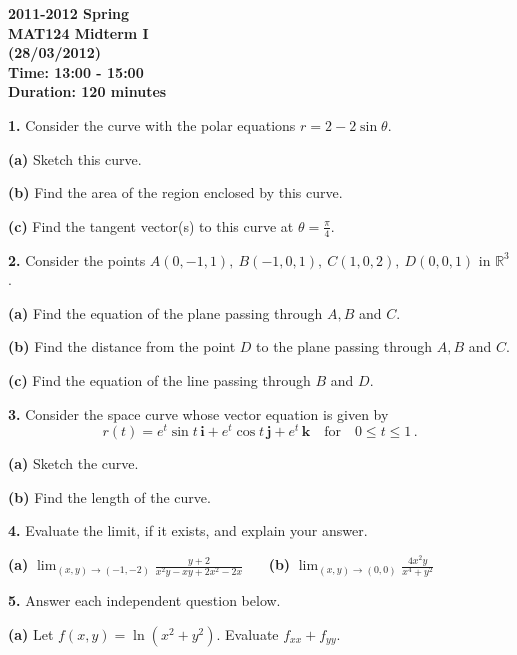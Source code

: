 \documentclass{article}
\begin{document}
\pagestyle{empty}
\large

\begin{center}
\textbf{2011-2012 Spring \\MAT124 Midterm I\\(28/03/2012)\\Time: 13:00 - 15:00\\Duration: 120 minutes}
\end{center}

\textbf{1.} Consider the curve with the polar equations $r=2-2\sin\theta$.

\textbf{(a)} Sketch this curve.

\textbf{(b)} Find the area of the region enclosed by this curve.

\textbf{(c)} Find the tangent vector(s) to this curve at $\displaystyle\theta=\frac\pi4$.

\vspace{1em}

\textbf{2.} Consider the points $A(0,-1,1),\:B(-1,0,1),\:C(1,0,2),\:D(0,0,1)$ in $\mathbb{R}^3$.

\textbf{(a)} Find the equation of the plane passing through $A, B$ and $C$.

\textbf{(b)} Find the distance from the point $D$ to the plane passing through $A, B$ and $C$.

\textbf{(c)} Find the equation of the line passing through $B$ and $D$.

\vspace{1em}

\textbf{3.} Consider the space curve whose vector equation is given by
\[r(t)= e ^t\sin t\,\mathbf{i}+ e ^t\cos t\,\mathbf{j}+ e ^t\,\mathbf{k} \quad\text{for}\quad 0\leq t\leq1\,.\]

\textbf{(a)} Sketch the curve.

\textbf{(b)} Find the length of the curve.

\vspace{1em}

\textbf{4.} Evaluate the limit, if it exists, and explain your answer.

\textbf{(a)} $\displaystyle \lim_{(x,y)\to(-1,-2)}\frac{y+2}{x^2y-xy+2x^2-2x}$ \ \ \ \textbf{(b)} $\displaystyle\lim_{(x,y)\to(0,0)}\frac{4x^2y}{x^4+y^2}$
\vspace{1em}


\textbf{5.} Answer each independent question below.

\textbf{(a)} Let $f(x,y)=\ln\left(x^2+y^2\right)$. Evaluate $f_{xx}+f_{yy}$.
\end{document}
